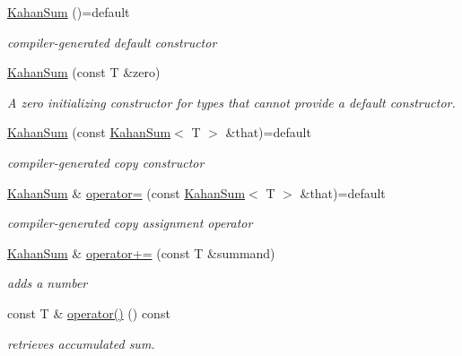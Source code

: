 \begin{DoxyCompactItemize}
\item 
\hyperlink{classwaveblocks_1_1_kahan_sum_a14f2375af4f7a2d537a93a4e385a1da1}{Kahan\+Sum} ()=default
\begin{DoxyCompactList}\small\item\em compiler-\/generated default constructor \end{DoxyCompactList}\item 
\hyperlink{classwaveblocks_1_1_kahan_sum_ae81c0305e5c2f1188154e3265b33aed7}{Kahan\+Sum} (const T \&zero)
\begin{DoxyCompactList}\small\item\em A zero initializing constructor for types that cannot provide a default constructor. \end{DoxyCompactList}\item 
\hypertarget{classwaveblocks_1_1_kahan_sum_ab28e3b57ca3643290bcf245c478e1480}{}\hyperlink{classwaveblocks_1_1_kahan_sum_ab28e3b57ca3643290bcf245c478e1480}{Kahan\+Sum} (const \hyperlink{classwaveblocks_1_1_kahan_sum}{Kahan\+Sum}$<$ T $>$ \&that)=default\label{classwaveblocks_1_1_kahan_sum_ab28e3b57ca3643290bcf245c478e1480}

\begin{DoxyCompactList}\small\item\em compiler-\/generated copy constructor \end{DoxyCompactList}\item 
\hypertarget{classwaveblocks_1_1_kahan_sum_a45d992bd8ec6c417495c4df510c087aa}{}\hyperlink{classwaveblocks_1_1_kahan_sum}{Kahan\+Sum} \& \hyperlink{classwaveblocks_1_1_kahan_sum_a45d992bd8ec6c417495c4df510c087aa}{operator=} (const \hyperlink{classwaveblocks_1_1_kahan_sum}{Kahan\+Sum}$<$ T $>$ \&that)=default\label{classwaveblocks_1_1_kahan_sum_a45d992bd8ec6c417495c4df510c087aa}

\begin{DoxyCompactList}\small\item\em compiler-\/generated copy assignment operator \end{DoxyCompactList}\item 
\hyperlink{classwaveblocks_1_1_kahan_sum}{Kahan\+Sum} \& \hyperlink{classwaveblocks_1_1_kahan_sum_aee0ad6881394b6205e51bfb653f7bba0}{operator+=} (const T \&summand)
\begin{DoxyCompactList}\small\item\em adds a number \end{DoxyCompactList}\item 
const T \& \hyperlink{classwaveblocks_1_1_kahan_sum_ae737808fa3da9f853cfa9a2af06a2444}{operator()} () const 
\begin{DoxyCompactList}\small\item\em retrieves accumulated sum. \end{DoxyCompactList}\end{DoxyCompactItemize}


